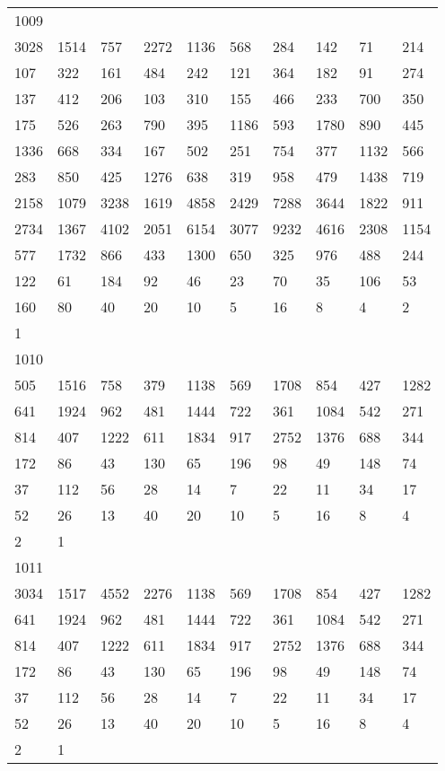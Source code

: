 \begin{longtable}{*{10}{l}}
1009&&&&&&&&&\\
3028& 1514& 757& 2272& 1136& 568& 284& 142& 71& 214\\
107& 322& 161& 484& 242& 121& 364& 182& 91& 274\\
137& 412& 206& 103& 310& 155& 466& 233& 700& 350\\
175& 526& 263& 790& 395& 1186& 593& 1780& 890& 445\\
1336& 668& 334& 167& 502& 251& 754& 377& 1132& 566\\
283& 850& 425& 1276& 638& 319& 958& 479& 1438& 719\\
2158& 1079& 3238& 1619& 4858& 2429& 7288& 3644& 1822& 911\\
2734& 1367& 4102& 2051& 6154& 3077& 9232& 4616& 2308& 1154\\
577& 1732& 866& 433& 1300& 650& 325& 976& 488& 244\\
122& 61& 184& 92& 46& 23& 70& 35& 106& 53\\
160& 80& 40& 20& 10& 5& 16& 8& 4& 2\\
1& \\

1010&&&&&&&&&\\
505& 1516& 758& 379& 1138& 569& 1708& 854& 427& 1282\\
641& 1924& 962& 481& 1444& 722& 361& 1084& 542& 271\\
814& 407& 1222& 611& 1834& 917& 2752& 1376& 688& 344\\
172& 86& 43& 130& 65& 196& 98& 49& 148& 74\\
37& 112& 56& 28& 14& 7& 22& 11& 34& 17\\
52& 26& 13& 40& 20& 10& 5& 16& 8& 4\\
2& 1& \\

1011&&&&&&&&&\\
3034& 1517& 4552& 2276& 1138& 569& 1708& 854& 427& 1282\\
641& 1924& 962& 481& 1444& 722& 361& 1084& 542& 271\\
814& 407& 1222& 611& 1834& 917& 2752& 1376& 688& 344\\
172& 86& 43& 130& 65& 196& 98& 49& 148& 74\\
37& 112& 56& 28& 14& 7& 22& 11& 34& 17\\
52& 26& 13& 40& 20& 10& 5& 16& 8& 4\\
2& 1& \\


\end{longtable}
